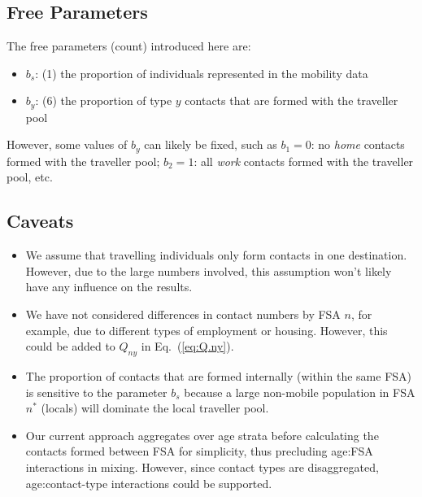 \documentclass{article}
\begin{document}
  \subsection{Free Parameters}\label{ss:params}
  The free parameters (count) introduced here are:
  \begin{itemize}
    \item $b_s$: (1) the proportion of individuals represented in the mobility data
    \item $b_y$: (6) the proportion of type $y$ contacts that are formed with the traveller pool
  \end{itemize}
  However, some values of $b_y$ can likely be fixed, such as
  $b_1 = 0$: no \emph{home} contacts formed with the traveller pool;
  $b_2 = 1$: all \emph{work} contacts formed with the traveller pool, etc.
  \pagebreak
  \subsection{Caveats}\label{ss:caveats}
  \begin{itemize}
    \item We assume that travelling individuals only form contacts in one destination.
          However, due to the large numbers involved,
          this assumption won't likely have any influence on the results.
    \item We have not considered differences in contact numbers by FSA $n$,
          for example, due to different types of employment or housing.
          However, this could be added to $Q_{ny}$ in Eq.~(\ref{eq:Q.ny}).
    \item The proportion of contacts that are formed internally (within the same FSA)
          is sensitive to the parameter $b_s$ because
          a large non-mobile population in FSA $n^*$ (locals) will dominate the local traveller pool.
    \item Our current approach aggregates over age strata before calculating
          the contacts formed between FSA for simplicity, thus precluding age:FSA interactions in mixing.
          However, since contact types are disaggregated,
          age:contact-type interactions could be supported.
  \end{itemize}
\end{document}
